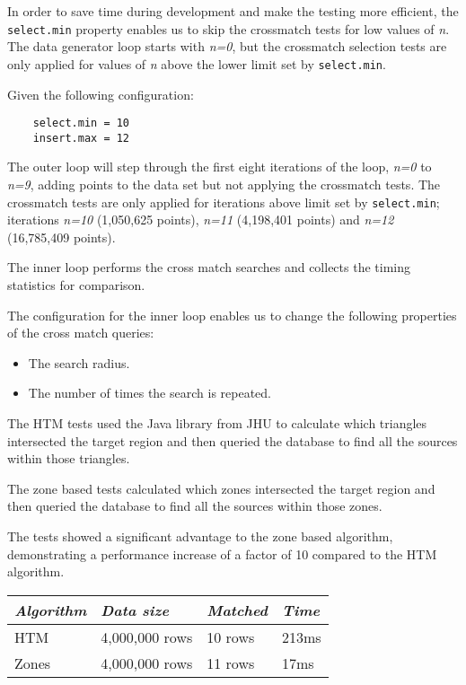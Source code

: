 \documentclass{article}
\newcommand{\crossmatch} {crossmatch\xspace}
\begin{document}
In order to save time during development and make the testing more efficient, the \texttt{select.min} property enables us to skip the \crossmatch tests for low values of \textit{n}. The data generator loop starts with \textit{n=0}, but the \crossmatch selection tests are only applied for values of \textit{n} above the lower limit set by \texttt{select.min}.

\noindent Given the following configuration:

\begin{lstlisting}
    select.min = 10
    insert.max = 12
\end{lstlisting}

The outer loop will step through the first eight iterations of the loop, \textit{n=0} to \textit{n=9}, adding points to the data set but not applying the \crossmatch tests. The \crossmatch tests are only applied for iterations above limit set by \texttt{select.min}; iterations \textit{n=10} (1,050,625 points), \textit{n=11} (4,198,401 points) and \textit{n=12} (16,785,409 points).

The inner loop performs the cross match searches and collects the timing statistics for comparison. 

The configuration for the inner loop enables us to change the following properties of the cross match queries:

\begin{itemize}
    \item The search radius.
    \item The number of times the search is repeated.
\end{itemize}

\clearpage





The HTM tests used the Java library from JHU to calculate which triangles intersected the target region and then queried the database to find all the sources within those triangles.

The zone based tests calculated which zones intersected the target region and then queried the database to find all the sources within those zones.

The tests showed a significant advantage to the zone based algorithm, demonstrating a performance increase of a factor of 10 compared to the HTM algorithm.

\begin{table}[h]
\centering
\begin{tabular}{|l|l|l|l|}
\hline
\textit{Algorithm} & \textit{Data size} & \textit{Matched} & \textit{Time}  \\ \hline
HTM   & 4,000,000 rows & 10 rows & 213ms \\ \hline
Zones & 4,000,000 rows & 11 rows & 17ms  \\ \hline
\end{tabular}
\end{table}
\end{document}
